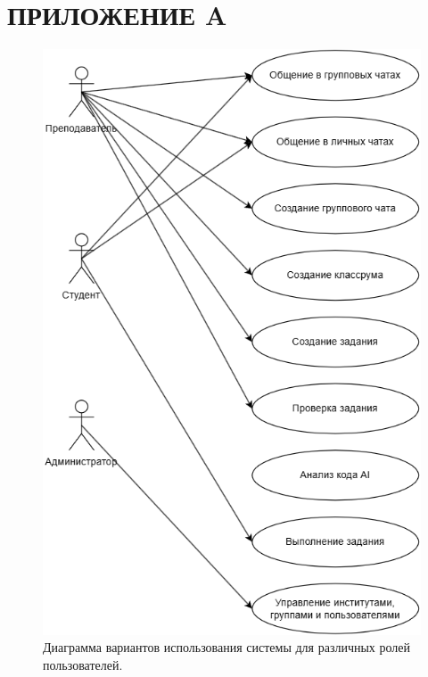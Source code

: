 \newpage
{}
\tableofcontents









\newpage

\section*{ПРИЛОЖЕНИЕ A}

\setcounter{figure}{0} 
\makeatletter
  \renewcommand{\thefigure}{A.\arabic{figure}}
\makeatother


\begin{figure}[H]
\centering
\includegraphics[width=0.5\linewidth]{static/useCaseDiagramm}
\caption{Диаграмма вариантов использования системы для различных ролей пользователей.}
\label{fig:usecasediagramm}
\end{figure}

